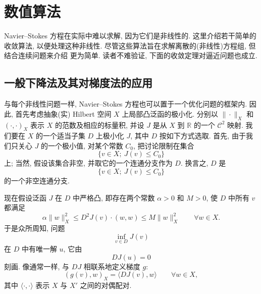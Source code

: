 \section{数值算法}
\label{sec:navier-numerical-algorithms}

Navier--Stokes 方程在实际中难以求解, 因为它们是非线性的. 这里介绍若干简单的收敛算法,
以便处理这种非线性. 尽管这些算法旨在求解离散的(非线性)方程组, 但结合连续问题来介绍
更为简单. 读者不难验证, 下面的收敛定理对逼近问题也成立.

\subsection{一般下降法及其对梯度法的应用}
\label{subsec:navier-general-descent}

与每个非线性问题一样, Navier--Stokes 方程也可以置于一个优化问题的框架内. 因此,
首先考虑抽象(实) Hilbert 空间 $X$ 上局部凸泛函的极小化. 分别以 $\|\cdot\|_X$
和 $(\cdot,\cdot)_X$ 表示 $X$ 的范数及相应的标量积, 并设 $J$ 是从 $X$ 到
$\mathbb R$ 的一个 $\mathcal C^2$ 映射. 我们要在 $X$ 的一个适当子集 $D$ 上极小化
$J$, 其中 $D$ 按如下方式选取. 首先, 由于我们只关心 $J$ 的一个极小值, 对某个常数
$C_0$, 把讨论限制在集合
\[
\{v\in X;\ J(v)\leq C_0\}
\]
上; 当然, 假设该集合非空, 并取它的一个连通分支作为 $D$. 换言之, $D$ 是
\begin{equation}
\label{eq:navier-descent-sublevel}
\{v\in X;\ J(v)\leq C_0\}
\end{equation}
的一个非空连通分支.

现在假设泛函 $J$ 在 $D$ 中严格凸, 即存在两个常数 $\alpha>0$ 和 $M>0$, 使
$D$ 中所有 $v$ 都满足
\begin{equation}
\label{eq:navier-descent-strong-convexity}
\alpha\|w\|_X^2\leq D^2J(v)\mathbin{\cdot}(w,w)
\leq M\|w\|_X^2
\qquad\forall w\in X.
\end{equation}
于是众所周知, 问题
\begin{equation}
\label{eq:navier-descent-minimization}
\inf_{v\in D}J(v)
\end{equation}
在 $D$ 中有唯一解 $u$, 它由
\begin{equation}
\label{eq:navier-descent-stationarity}
DJ(u)=0
\end{equation}
刻画. 像通常一样, 与 $DJ$ 相联系地定义梯度 $g$:
\[
(g(v),w)_X=\langle DJ(v),w\rangle
\qquad\forall w\in X,
\]
其中 $\langle\cdot,\cdot\rangle$ 表示 $X$ 与 $X'$ 之间的对偶配对.

